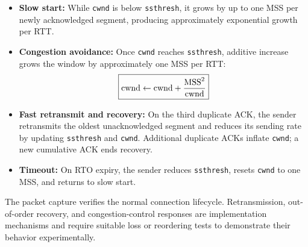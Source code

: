 \documentclass[12pt]{article}
\begin{document}
\begin{itemize}
    \item \textbf{Slow start:} While \texttt{cwnd} is below \texttt{ssthresh}, it grows by up to one MSS per newly acknowledged segment, producing approximately exponential growth per RTT.
    
    \item \textbf{Congestion avoidance:} Once \texttt{cwnd} reaches \texttt{ssthresh}, additive increase grows the window by approximately one MSS per RTT:
    \[
\fbox{\(
\displaystyle
\mathrm{cwnd} \leftarrow \mathrm{cwnd}
+ \frac{\mathrm{MSS}^{2}}{\mathrm{cwnd}}
\)}
\]
    
    \item \textbf{Fast retransmit and recovery:} On the third duplicate ACK, the sender retransmits the oldest unacknowledged segment and reduces its sending rate by updating \texttt{ssthresh} and \texttt{cwnd}. Additional duplicate ACKs inflate \texttt{cwnd}; a new cumulative ACK ends recovery.
    
    \item \textbf{Timeout:} On RTO expiry, the sender reduces \texttt{ssthresh}, resets \texttt{cwnd} to one MSS, and returns to slow start.
\end{itemize}

The packet capture verifies the normal connection lifecycle. Retransmission, out-of-order recovery, and congestion-control responses are implementation mechanisms and require suitable loss or reordering tests to demonstrate their behavior experimentally.
\end{document}
